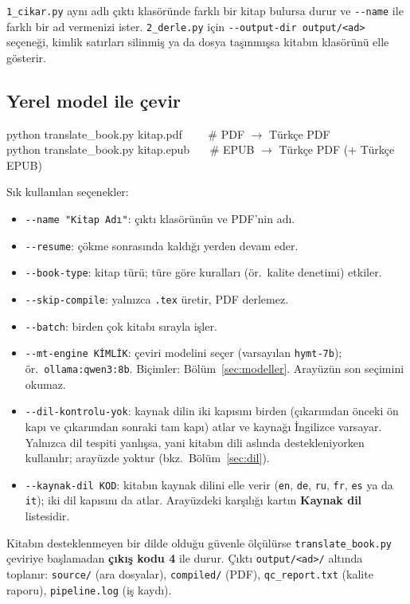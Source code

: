 \documentclass[11pt,a4paper]{article}
\newcommand{\dugme}[1]{\textsf{\bfseries #1}}
\newcommand{\dosya}[1]{\texttt{#1}}
\begin{document}
\dosya{1\_cikar.py} aynı adlı çıktı klasöründe farklı bir kitap bulursa durur
ve \dosya{-{}-name} ile farklı bir ad vermenizi ister. \dosya{2\_derle.py}
için \dosya{-{}-output-dir output/<ad>} seçeneği, kimlik satırları silinmiş
ya da dosya taşınmışsa kitabın klasörünü elle gösterir.

\subsection{Yerel model ile çevir}
\begin{komut}
python translate\_book.py kitap.pdf \ \ \ \ \# PDF \(\rightarrow\) Türkçe PDF\\
python translate\_book.py kitap.epub \ \ \ \# EPUB \(\rightarrow\) Türkçe PDF (+ Türkçe EPUB)
\end{komut}

Sık kullanılan seçenekler:
\begin{itemize}
  \item \dosya{-{}-name "Kitap Adı"}: çıktı klasörünün ve PDF'nin adı.
  \item \dosya{-{}-resume}: çökme sonrasında kaldığı yerden devam eder.
  \item \dosya{-{}-book-type}: kitap türü; türe göre kuralları (ör.\ kalite
        denetimi) etkiler.
  \item \dosya{-{}-skip-compile}: yalnızca \dosya{.tex} üretir, PDF derlemez.
  \item \dosya{-{}-batch}: birden çok kitabı sırayla işler.
  \item \dosya{-{}-mt-engine KİMLİK}: çeviri modelini seçer (varsayılan
        \dosya{hymt-7b}); ör.\ \dosya{ollama:qwen3:8b}. Biçimler:
        Bölüm~\ref{sec:modeller}. Arayüzün son seçimini okumaz.
  \item \dosya{-{}-dil-kontrolu-yok}: kaynak dilin iki kapısını birden
        (çıkarımdan önceki ön kapı ve çıkarımdan sonraki tam kapı) atlar ve
        kaynağı İngilizce varsayar. Yalnızca dil tespiti yanlışsa, yani
        kitabın dili aslında destekleniyorken kullanılır; arayüzde yoktur
        (bkz.\ Bölüm~\ref{sec:dil}).
  \item \dosya{-{}-kaynak-dil KOD}: kitabın kaynak dilini elle verir
        (\dosya{en}, \dosya{de}, \dosya{ru}, \dosya{fr}, \dosya{es} ya da
        \dosya{it}); iki dil kapısını da atlar. Arayüzdeki karşılığı kartın
        \dugme{Kaynak dil} listesidir.
\end{itemize}
Kitabın desteklenmeyen bir dilde olduğu güvenle ölçülürse
\dosya{translate\_book.py} çeviriye başlamadan \textbf{çıkış kodu 4} ile
durur.
Çıktı \dosya{output/<ad>/} altında toplanır: \dosya{source/} (ara dosyalar),
\dosya{compiled/} (PDF), \dosya{qc\_report.txt} (kalite raporu),
\dosya{pipeline.log} (iş kaydı).
\end{document}
